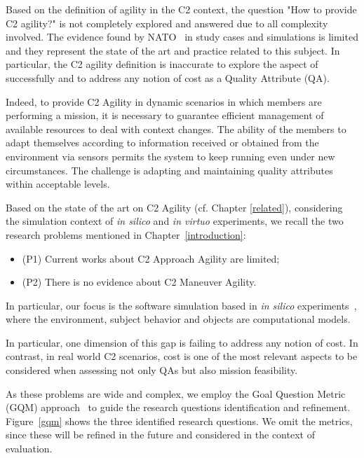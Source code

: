 Based on the definition of agility in the C2 context, the question "How to provide C2 agility?" is not completely explored and answered due to all complexity involved. The evidence found by NATO~\cite{FRANCE2014} in study cases and simulations is limited and they represent the state of the art and practice related to this subject. In particular, the C2 agility definition is inaccurate to explore the aspect of successfully and to address any notion of cost as a Quality Attribute (QA).

Indeed, to provide C2 Agility in dynamic scenarios in which members are performing a mission, it is necessary to guarantee efficient management of available resources to deal with context changes. The ability of the members to adapt themselves according to information received or obtained from the environment via sensors permits the system to keep running even under new circumstances. The challenge is adapting and maintaining quality attributes within acceptable levels.

Based on the state of the art on C2 Agility (cf. Chapter \ref{related}), considering the simulation context of \textit{in silico} and \textit{in virtuo} experiments\cite{simulation01}, we recall the two research problems mentioned in Chapter~\ref{introduction}:

\begin{itemize}
    \item (P1) Current works about C2 Approach Agility are limited;
    \item (P2) There is no evidence about C2 Maneuver Agility.
\end{itemize}

In particular, our focus is the software simulation based in \textit{in silico} experiments~\cite{simulation01}, where the environment, subject behavior and objects are computational models.










In particular, one dimension of this gap is failing to address any notion of cost. In contrast, in real world C2  scenarios, cost is one of the most relevant aspects to be considered when assessing not only QAs but also mission feasibility. 

As these problems are wide and complex, we employ the Goal Question Metric (GQM) approach~\cite{gqm1} to guide the research questions identification and refinement. Figure~\ref{gqm} shows the three identified research questions. We omit the metrics, since these will be refined in the future and considered in the context of evaluation.  

